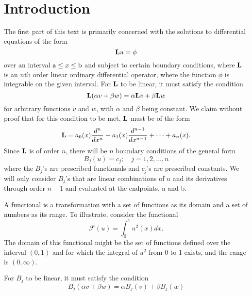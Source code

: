 \section{Introduction}
The first part of this text is primarily concerned with the solutions to differential equations of the form
\begin{equation}
    \mathrm{\bf{L}} u=\phi
\end{equation}
over an interval \(\mathrm{a} \leq x \leq \mathrm{b}\) and subject to certain boundary conditions, where \(\mathrm{\bf{L}}\) is an \(n\)th order linear ordinary differential operator, where the function \(\phi\) is integrable on the given interval. For \(\mathrm{\bf{L}}\) to be linear, it must satisfy the condition
\begin{equation}
	\mathrm{\bf{L}}(\alpha v + \beta w) = \alpha \mathrm{\bf{L}} v + \beta \mathrm{\bf{L}} w
\end{equation}
for arbitrary functions \(v\) and \(w\), with \(\alpha\) and \(\beta\) being constant. We claim without proof that for this condition to be met, \(\mathrm{\bf{L}}\) must be of the form
\begin{equation} 
	\mathrm{\bf{L}} = a_0(x) \frac{d^n}{dx^n} + a_1(x) \frac{d^{n-1}}{dx^{n-1}} + \cdots + a_n(x).
\end{equation}
Since \(\mathrm{\bf{L}}\) is of order \(n\), there will be \(n\) boundary conditions of the general form 
\begin{equation}
	B_j (u) = c_j;\quad j=1,2,\dots,n
\end{equation}
where the \(B_j\)'s are prescribed functionals and \(c_j\)'s are prescribed constants. We will only consider \(B_j\)'s that are linear combinations of \(u\) and its derivatives through order \(n-1\) and evaluated at the endpoints, a and b. 

A functional is a transformation with a set of functions as its domain and a set of numbers as its range. To illustrate, consider the functional 
\begin{equation}
	\mathcal{F}(u) = \int_{0}^{1} u^2(x)dx.
\end{equation}
The domain of this functional might be the set of functions defined over the interval \((0,1)\) and for which the integral of \(u^2\) from 0 to 1 exists, and the range is \((0, \infty)\).

For \(B_j\) to be linear, it must satisfy the condition
\begin{equation}
	B_j(\alpha v + \beta w) = \alpha B_j (v) + \beta B_j(w)
\end{equation}